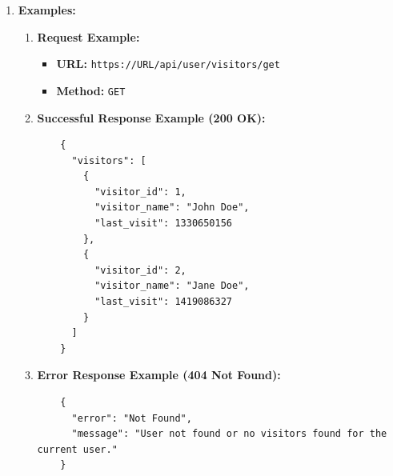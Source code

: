 \documentclass[a4 paper, 12pt]{article}
\begin{document}
\begin{enumerate}
\begin{enumerate}
    \item \textbf{401 Unauthorized:}
    \begin{itemize}
      \item \textbf{Description:} The request is missing valid authentication credentials or the provided credentials are invalid.
      \item \textbf{Example:}
      \begin{verbatim}
      {
        "error": "Unauthorized",
        "message": "Authentication credentials are missing or invalid."
      }
      \end{verbatim}
    \end{itemize}

    \item \textbf{400 Bad Request:}
    \begin{itemize}
      \item \textbf{Description:} The request is malformed or contains invalid parameters.
      \item \textbf{Example:}
      \begin{verbatim}
      {
        "error": "Bad Request",
        "message": "Invalid parameters in the request."
      }
      \end{verbatim}
    \end{itemize}
  \end{enumerate}

  \item \textbf{Examples:}
  \begin{enumerate}
    \item \textbf{Request Example:}
    \begin{itemize}
      \item \textbf{URL:} \texttt{https://URL/api/user/visitors/get}
      \item \textbf{Method:} \texttt{GET}
    \end{itemize}

    \item \textbf{Successful Response Example (200 OK):}
    \begin{verbatim}
    {
      "visitors": [
        {
          "visitor_id": 1,
          "visitor_name": "John Doe",
          "last_visit": 1330650156
        },
        {
          "visitor_id": 2,
          "visitor_name": "Jane Doe",
          "last_visit": 1419086327
        }
      ]
    }
    \end{verbatim}

    \item \textbf{Error Response Example (404 Not Found):}
    \begin{verbatim}
    {
      "error": "Not Found",
      "message": "User not found or no visitors found for the current user."
    }
    \end{verbatim}


\end{enumerate}
\end{enumerate}
\end{document}
